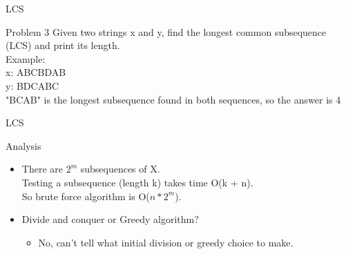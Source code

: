 \documentclass{beamer}
\begin{document}
\begin{frame}{LCS}
  \begin{block}{Problem 3}
    Given two strings x and y, find the longest common subsequence (LCS) and print its length.\\
    Example:\\
    x: ABCBDAB\\
    y: BDCABC\\
    "BCAB" is the longest subsequence found in both sequences, so the answer is 4
  \end{block}
\end{frame}

\begin{frame}[<+->]{LCS}
  \begin{block}{Analysis}
  \begin{itemize}
    \item There are $2^m$ subsequences of X.\\
    Testing a subsequence (length k) takes time O(k + n).\\
    So brute force algorithm is O($n* 2^m$).
    \item Divide and conquer or Greedy algorithm?\\
      \begin{itemize}
      \item No, can't tell what initial division or greedy choice to make.
      \end{itemize}
  \end{itemize}
  \end{block}
\end{frame}
\end{document}

